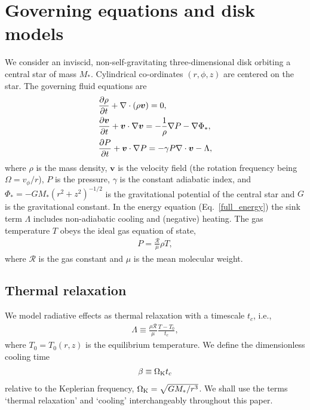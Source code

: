 \section{Governing equations and disk models}\label{setup}
We consider  an inviscid, non-self-gravitating three-dimensional 
disk orbiting a central star of mass $M_*$.  Cylindrical
co-ordinates $(r,\phi, z)$ are centered on the star. The governing fluid equations are
\begin{align}
  &\frac{\p\rho}{\p t} + \nabla\cdot{\left(\rho\bm{v}\right)} = 0,\label{full_mass}\\
  &\frac{\p\bm{v}}{\p t} + \bm{v}\cdot\nabla\bm{v} =
  -\frac{1}{\rho}\nabla P - \nabla\Phi_*,\\
  &\frac{\p P}{\p t} + \bm{v}\cdot\nabla P  = - \gamma P
  \nabla\cdot\bm{v} - \Lambda %
  , \label{full_energy}
\end{align}
where $\rho$ is the mass density, $\bm{v}$ is the velocity field (the
rotation frequency being $\Omega=v_\phi/r$), $P$
is the pressure, $\gamma$ is the constant adiabatic index, and $\Phi_*
= -GM_*(r^2 + z^2)^{-1/2}$ is the gravitational potential of the
central star and $G$ is the gravitational constant. 
In the energy equation (Eq.\ \ref{full_energy}) the sink term
$\Lambda$ includes non-adiabatic cooling and (negative) heating. 
The gas temperature $T$ obeys the ideal gas 
equation of state,  
\begin{align}
P = \frac{\mathcal{R}}{\mu}\rho T,
\end{align}
where $\mathcal{R}$ is the gas constant and $\mu$ is the mean molecular
weight.    

\subsection{Thermal relaxation}
We model radiative effects as thermal
relaxation with a timescale $t_c$, i.e.,
\begin{align}\label{thermal_relax}
  \Lambda  \equiv \frac{\rho\mathcal{R}}{\mu}\frac{T - T_0}{t_c},
\end{align}
where $T_0=T_0(r,z)$ is the equilibrium temperature.  We 
define the dimensionless cooling time 
\begin{align}\label{beta_def}
  \beta \equiv \Omega_{\rm K} t_c
\end{align}
relative to the Keplerian frequency, $\Omega_{\rm K}=\sqrt{GM_*/r^3}$.  We shall
use the terms `thermal relaxation' and `cooling' interchangeably
throughout this paper.   

